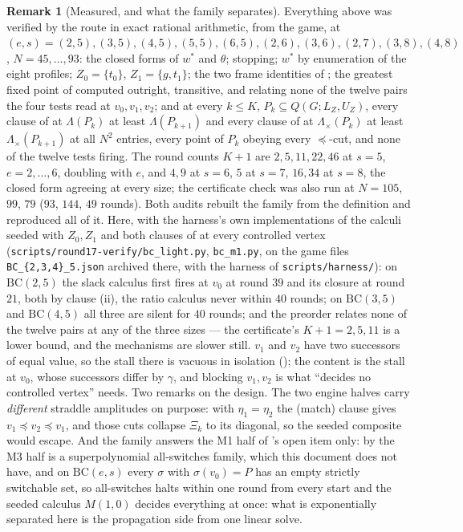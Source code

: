 \documentclass[11pt]{article}
\theoremstyle{plain}
\theoremstyle{definition}
\newtheorem{remark}[theorem]{Remark}
\begin{document}
\begin{remark}[Measured, and what the family separates]\label{rem:bc-measured}
Everything above was verified by the route in exact rational arithmetic,
from the game, at $(e,s)=(2,5),(3,5),(4,5),(5,5),(6,5),(2,6),(3,6),(2,7),(3,8),(4,8)$,
$N=45,\dots,93$: the closed forms of $w^\ast$ and $\theta$; stopping;
$w^\ast$ by enumeration of the eight profiles; $Z_0=\{t_0\}$,
$Z_1=\{g,t_1\}$; the two frame identities of ; the
greatest fixed point of  computed outright, transitive,
and relating none of the twelve pairs the four tests read at
$v_0,v_1,v_2$; and at every $k\le K$, $P_k\subseteq Q(G;L_Z,U_Z)$, every
clause of  at $\Lambda(P_k)$ at least $\Lambda(P_{k+1})$
and every clause of  at $\Lambda_\times(P_k)$ at least
$\Lambda_\times(P_{k+1})$ at all $N^{2}$ entries, every point of $P_k$
obeying every $\preceq$-cut, and none of the twelve tests firing. The
round counts $K+1$ are $2,5,11,22,46$ at $s=5$, $e=2,\dots,6$, doubling
with $e$, and $4,9$ at $s=6$, $5$ at $s=7$, $16,34$ at $s=8$, the closed
form agreeing at every size; the certificate check was also run at
$N=105$, $99$, $79$ ($93$, $144$, $49$ rounds). Both audits rebuilt the
family from the definition and reproduced all of it. Here, with the
harness's own implementations of the calculi seeded with $Z_0,Z_1$ and
both clauses of  at every controlled vertex
(\texttt{scripts/round17-verify/bc\_light.py}, \texttt{bc\_m1.py}, on the
game files \texttt{BC\_\{2,3,4\}\_5.json} archived there, with the harness
of \texttt{scripts/harness/}): on
$\mathrm{BC}(2,5)$ the slack calculus first fires at $v_0$ at round $39$
and its closure at round $21$, both by clause (ii), the ratio calculus
never within $40$ rounds; on $\mathrm{BC}(3,5)$ and $\mathrm{BC}(4,5)$
all three are silent for $40$ rounds; and the preorder relates none of
the twelve pairs at any of the three sizes --- the certificate's
$K+1=2,5,11$ is a lower bound, and the mechanisms are slower still.
$v_1$ and $v_2$ have two successors of equal value, so the stall there is
vacuous in isolation (); the content is the stall at
$v_0$, whose successors differ by $\gamma$, and blocking $v_1,v_2$ is what
``decides no controlled vertex'' needs.
Two remarks on the design. The two engine halves carry \emph{different}
straddle amplitudes on purpose: with $\eta_1=\eta_2$ the (match) clause
gives $v_1\preceq v_2\preceq v_1$, and those cuts collapse $\Xi_k$ to its
diagonal, so the seeded composite would escape. And the family answers
the M1 half of 's open item only: by
 the M3 half is a superpolynomial all-switches
family, which this document does not have, and on $\mathrm{BC}(e,s)$
every $\sigma$ with $\sigma(v_0)=P$ has an empty strictly switchable set,
so all-switches halts within one round from every start and the seeded
calculus $M(1,0)$ decides everything at once: what is exponentially
separated here is the propagation side from one linear solve.
\end{remark}
\end{document}
